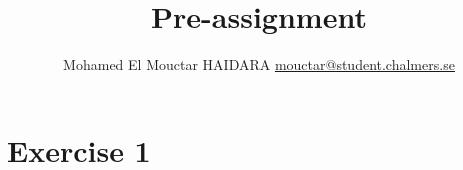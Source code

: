 \documentclass[12pt]{article}
\begin{document}
\title{Pre-assignment}
\author{Mohamed El Mouctar HAIDARA \href{mailto:mouctar@student.chalmers.se}{mouctar@student.chalmers.se}}

\maketitle
\tableofcontents
\section{Exercise 1}
\end{document}
